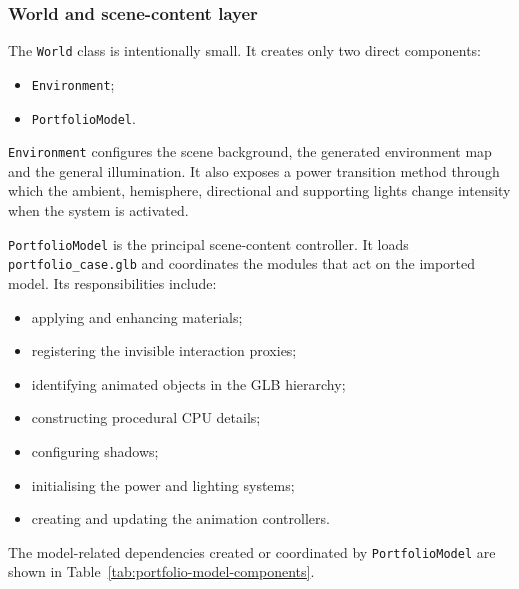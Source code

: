 \documentclass{report}
\begin{document}
\subsubsection{World and scene-content layer}

The \texttt{World} class is intentionally small. It creates only two
direct components:

\begin{itemize}
    \item \texttt{Environment};
    \item \texttt{PortfolioModel}.
\end{itemize}

\texttt{Environment} configures the scene background, the generated
environment map and the general illumination. It also exposes a power
transition method through which the ambient, hemisphere, directional
and supporting lights change intensity when the system is activated.

\texttt{PortfolioModel} is the principal scene-content controller. It
loads \texttt{portfolio\_case.glb} and coordinates the modules that act
on the imported model. Its responsibilities include:

\begin{itemize}
    \item applying and enhancing materials;
    \item registering the invisible interaction proxies;
    \item identifying animated objects in the GLB hierarchy;
    \item constructing procedural CPU details;
    \item configuring shadows;
    \item initialising the power and lighting systems;
    \item creating and updating the animation controllers.
\end{itemize}

The model-related dependencies created or coordinated by
\texttt{PortfolioModel} are shown in
Table~\ref{tab:portfolio-model-components}.
\end{document}
